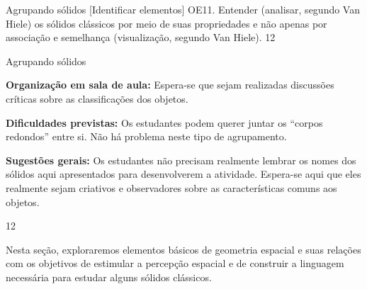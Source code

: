 \clearmargin
\clearmargin
\begin{objectives}{Agrupando sólidos}
{
{[}Identificar elementos{]} OE11. Entender (analisar, segundo Van Hiele) os sólidos clássicos por meio de suas propriedades e não apenas por associação e semelhança (visualização, segundo Van Hiele).
}{1}{2}
\end{objectives}
\begin{sugestions}{Agrupando sólidos}
{
\textbf{Organização em sala de aula:} Espera-se que sejam realizadas discussões críticas sobre as classificações dos objetos.

\textbf{Dificuldades previstas:} Os estudantes podem querer juntar os  “corpos redondos” entre si. Não há problema neste tipo de agrupamento.

\textbf{Sugestões gerais:} Os estudantes não precisam realmente lembrar os nomes dos sólidos aqui apresentados para desenvolverem a atividade. Espera-se aqui que eles realmente sejam criativos e observadores sobre as características comuns aos objetos.
}{1}{2}
\end{sugestions}


\label{\detokenize{GE504-5:explorando-elementos-de-geometria-espacial-e-volumes}}\label{\detokenize{GE504-5::doc}}
Nesta seção, exploraremos elementos básicos de geometria espacial e suas relações com os objetivos de estimular a percepção espacial e de construir a linguagem necessária para estudar alguns sólidos clássicos.


